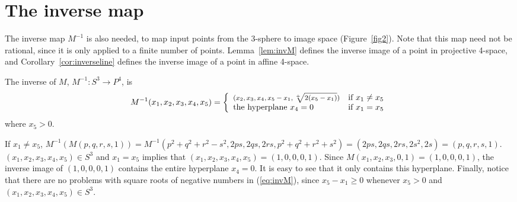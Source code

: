 

\section{The inverse map}
\label{sec:invM}

The inverse map $M^{-1}$ is also needed,
to map input points from the 3-sphere to image space (Figure~\ref{fig2}).
Note that this map need not be rational, since it is only applied to
a finite number of points.
Lemma~\ref{lem:invM} defines the inverse image of a point in projective 4-space,
and Corollary~\ref{cor:inverseline}
defines the inverse image of a point in affine 4-space.

\begin{lemma}
\label{lem:invM}
The inverse of $M$, $M^{-1}:S^3 \rightarrow P^4$, is
\begin{equation}
\label{eq:invM}
M^{-1} (x_1,x_2,x_3,x_4,x_5) = 
\left\{ \begin{array}{ll}
\mbox{\footnotesize{$(x_2,x_3,x_4,x_5-x_1,\sqrt[+]{2(x_5-x_1)})$}}
	& \mbox{if } x_1 \neq x_5 \\
\mbox{the hyperplane } x_4 = 0 
	& \mbox{if } x_1 = x_5
\end{array} \right.
\end{equation}
where $x_5 > 0$.
\end{lemma}
\prf
%
%
If $x_1 \neq x_5$, $M^{-1}(M(p,q,r,s,1)) = 
 M^{-1}(p^2+q^2+r^2-s^2,2ps,2qs,2rs,p^2+q^2+r^2+s^2) = 
 (2ps,2qs,2rs,2s^2,2s) = (p,q,r,s,1)$.
%
$(x_1,x_2,x_3,x_4,x_5) \in S^3$ and $x_1 = x_5$ implies that
$(x_1,x_2,x_3,x_4,x_5) = (1,0,0,0,1)$.
Since $M(x_1,x_2,x_3,0,1) = (1,0,0,0,1)$, the inverse image
of $(1,0,0,0,1)$ contains the entire hyperplane $x_4=0$.
It is easy to see that it only contains this hyperplane.
%
Finally, notice that there are no problems with square roots of negative
numbers in (\ref{eq:invM}), since $x_5-x_1 \geq 0$ whenever $x_5 > 0$ and
$(x_1,x_2,x_3,x_4,x_5) \in S^3$.
\QED

